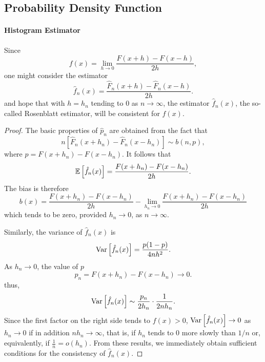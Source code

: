 \subsection{Probability Density Function}

\paragraph{Histogram Estimator}
Since
\begin{equation*}
	f(x)=\lim_{h\rightarrow0}\frac{F(x+h)-F(x-h)}{2h},
\end{equation*}
one might consider the estimator
\begin{equation*}
	\hat{f}_{n}(x)=\frac{\hat{F}_{n}(x+h)-\hat{F}_{n}(x-h)}{2h}.
\end{equation*}
and hope that with \(h=h_{n}\) tending to 0 as \(n\rightarrow\infty\), the estimator \(\hat{f}_{n}(x)\), the so-called Rosenblatt estimator, will be consistent for \(f(x)\).

\begin{proof}
	The basic properties of \(\hat{p}_{n}\) are obtained from the fact that
	\begin{equation*}
		n\left[\hat{F}_{n}(x+h_{n})-\hat{F}_{n}(x-h_{n})\right]\sim b(n,p),
	\end{equation*}
	where \(p=F(x+h_{n})-F(x-h_{n})\). It follows that
	\begin{equation*}
		\mathbb{E}\left[\hat{f}_{n}(x)\right]=\frac{F(x+h_{n})-F(x-h_{n})}{2h}.
	\end{equation*}
	The bias is therefore
	\begin{equation*}
		b(x)=\frac{F(x+h_{n})-F(x-h_{n})}{2h}-\lim_{h_{n}\rightarrow0}\frac{F(x+h_{n})-F(x-h_{n})}{2h}
	\end{equation*}
	which tends to be zero, provided \(h_{n}\rightarrow0\), as \(n\rightarrow\infty\).

	Similarly, the variance of \(\hat{f}_{n}(x)\) is
	\begin{equation*}
		\mathrm{Var}\left[\hat{f}_{n}(x)\right]=\frac{p(1-p)}{4nh^{2}}.
	\end{equation*}
	As \(h_{n} \rightarrow 0\), the value of \(p\)
	\begin{equation*}
		p_{n}=F\left(x+h_{n}\right)-F\left(x-h_{n}\right) \rightarrow 0.
	\end{equation*}
	thus,
	\begin{equation*}
		\mathrm{Var}\left[\hat{f}_{n}(x)\right]\sim\frac{p_{n}}{2h_{n}}\cdot\frac{1}{2nh_{n}}.
	\end{equation*}
	Since the first factor on the right side tends to \(f(x)>0\), \(\mathrm{Var}\left[\hat{f}_{n}(x)\right] \rightarrow 0\) as \(h_{n}\rightarrow 0\) if in addition \(nh_{n}\rightarrow\infty\), that is, if \(h_{n}\) tends to 0 more slowly than \(1/n\) or, equivalently, if \(\frac{1}{n}=o\left(h_{n}\right)\).
	From these results, we immediately obtain sufficient conditions for the consistency of \(\hat{f}_{n}(x)\).
\end{proof}

